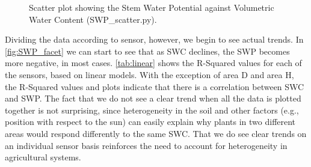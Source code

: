 \documentclass[12pt]{scrartcl}
\begin{document}
\begin{figure}[!htb]
        \caption{\label{fig:SWP_scatter} Scatter plot showing the Stem Water Potential against Volumetric Water Content (SWP\_scatter.py).}
\end{figure}

Dividing the data according to sensor, however, we begin to see actual trends. In \autoref{fig:SWP_facet} we can start to see that as SWC declines, the SWP becomes more negative, in most cases. \autoref{tab:linear} shows the R-Squared values for each of the sensors, based on linear models. With the exception of area D and area H, the R-Squared values and plots indicate that there is a correlation between SWC and SWP. The fact that we do not see a clear trend when all the data is plotted together is not surprising, since heterogeneity in the soil and other factors (e.g., position with respect to the sun) can easily explain why plants in two different areas would respond differently to the same SWC. That we do see clear trends on an individual sensor basis reinforces the need to account for heterogeneity in agricultural systems.
\end{document}
